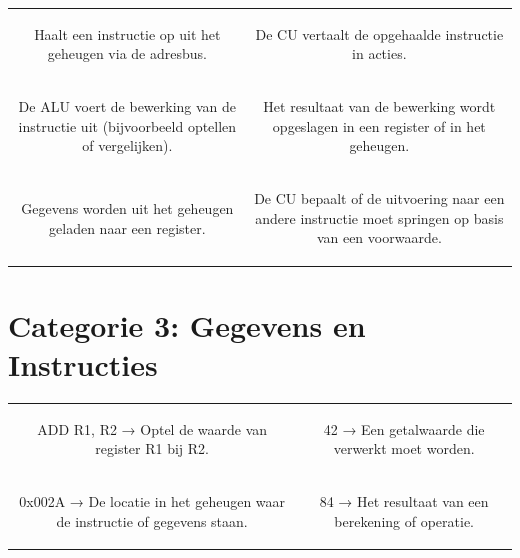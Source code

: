 \documentclass[a4paper,10pt]{article}
\begin{document}
\begin{center}
\begin{tabular}{c@{\hskip 1cm}c}
  \begin{tcolorbox}[title=Fetch]
    Haalt een instructie op uit het geheugen via de adresbus.
  \end{tcolorbox} &
  \begin{tcolorbox}[title=Decode]
    De CU vertaalt de opgehaalde instructie in acties.
  \end{tcolorbox} \\[1cm]
  \begin{tcolorbox}[title=Execute]
    De ALU voert de bewerking van de instructie uit (bijvoorbeeld optellen of vergelijken).
  \end{tcolorbox} &
  \begin{tcolorbox}[title=Store]
    Het resultaat van de bewerking wordt opgeslagen in een register of in het geheugen.
  \end{tcolorbox} \\[1cm]
  \begin{tcolorbox}[title=Load]
    Gegevens worden uit het geheugen geladen naar een register.
  \end{tcolorbox} &
  \begin{tcolorbox}[title=Branch]
    De CU bepaalt of de uitvoering naar een andere instructie moet springen op basis van een voorwaarde.
  \end{tcolorbox}
\end{tabular}
\end{center}

\newpage

\section*{Categorie 3: Gegevens en Instructies}

\begin{center}
\begin{tabular}{c@{\hskip 1cm}c}
  \begin{tcolorbox}[title=Instructie]
    ADD R1, R2 → Optel de waarde van register R1 bij R2.
  \end{tcolorbox} &
  \begin{tcolorbox}[title=Gegevens]
    42 → Een getalwaarde die verwerkt moet worden.
  \end{tcolorbox} \\[1cm]
  \begin{tcolorbox}[title=Adres]
    0x002A → De locatie in het geheugen waar de instructie of gegevens staan.
  \end{tcolorbox} &
  \begin{tcolorbox}[title=Resultaat]
    84 → Het resultaat van een berekening of operatie.
  \end{tcolorbox}
\end{tabular}
\end{center}
\end{document}
